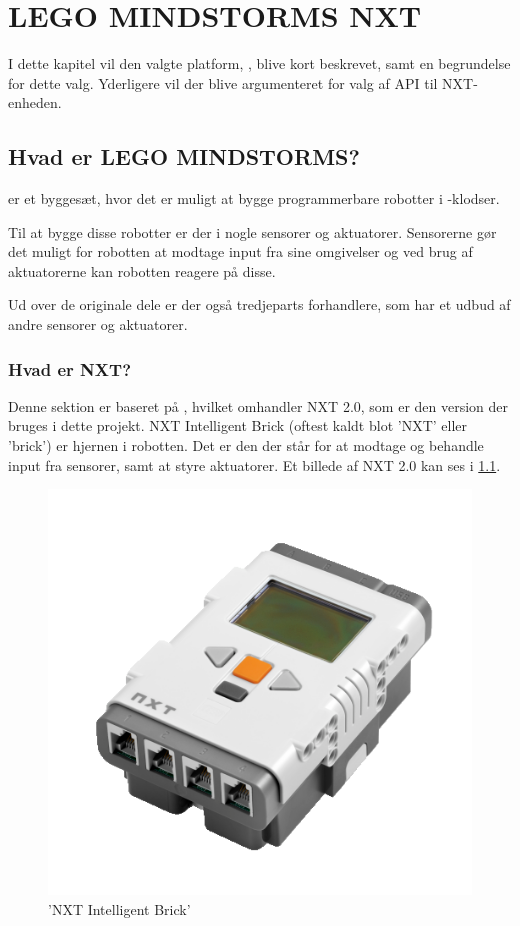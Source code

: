 
\chapter{LEGO MINDSTORMS NXT}
I dette kapitel vil den valgte platform, \legoms, blive kort beskrevet, samt en begrundelse for dette valg.
Yderligere vil der blive argumenteret for valg af API til NXT-enheden.

\section{Hvad er LEGO MINDSTORMS?}
\legoms er et byggesæt, hvor det er muligt at bygge programmerbare robotter i \lego-klodser.

Til at bygge disse robotter er der i \legoms nogle sensorer og aktuatorer. Sensorerne gør det muligt for robotten at modtage input fra sine omgivelser og ved brug af aktuatorerne kan robotten reagere på disse.

Ud over de originale \lego dele er der også tredjeparts forhandlere, som har et udbud af andre sensorer og aktuatorer.

\subsection{Hvad er NXT?}
Denne sektion er baseret på \cite{nxt}, hvilket omhandler NXT 2.0, som er den version der bruges i dette projekt.
NXT Intelligent Brick (oftest kaldt blot 'NXT' eller 'brick') er hjernen i \legoms robotten.
Det er den der står for at modtage og behandle input fra sensorer, samt at styre aktuatorer.
Et billede af NXT 2.0 kan ses i \cref{platform:nxt}.

\begin{figure}
\begin{center}
\includegraphics[scale=.5]{./graphics/nxt/brick}
\end{center}
\caption{'NXT Intelligent Brick'}
\label{platform:nxt}
\end{figure}

